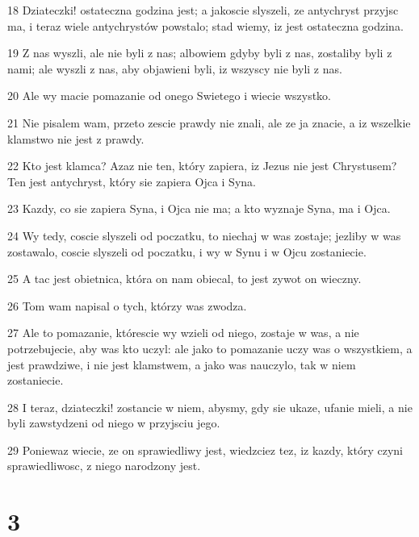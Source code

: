 \par 18 Dziateczki! ostateczna godzina jest; a jakoscie slyszeli, ze antychryst przyjsc ma, i teraz wiele antychrystów powstalo; stad wiemy, iz jest ostateczna godzina.
\par 19 Z nas wyszli, ale nie byli z nas; albowiem gdyby byli z nas, zostaliby byli z nami; ale wyszli z nas, aby objawieni byli, iz wszyscy nie byli z nas.
\par 20 Ale wy macie pomazanie od onego Swietego i wiecie wszystko.
\par 21 Nie pisalem wam, przeto zescie prawdy nie znali, ale ze ja znacie, a iz wszelkie klamstwo nie jest z prawdy.
\par 22 Kto jest klamca? Azaz nie ten, który zapiera, iz Jezus nie jest Chrystusem? Ten jest antychryst, który sie zapiera Ojca i Syna.
\par 23 Kazdy, co sie zapiera Syna, i Ojca nie ma; a kto wyznaje Syna, ma i Ojca.
\par 24 Wy tedy, coscie slyszeli od poczatku, to niechaj w was zostaje; jezliby w was zostawalo, coscie slyszeli od poczatku, i wy w Synu i w Ojcu zostaniecie.
\par 25 A tac jest obietnica, która on nam obiecal, to jest zywot on wieczny.
\par 26 Tom wam napisal o tych, którzy was zwodza.
\par 27 Ale to pomazanie, którescie wy wzieli od niego, zostaje w was, a nie potrzebujecie, aby was kto uczyl: ale jako to pomazanie uczy was o wszystkiem, a jest prawdziwe, i nie jest klamstwem, a jako was nauczylo, tak w niem zostaniecie.
\par 28 I teraz, dziateczki! zostancie w niem, abysmy, gdy sie ukaze, ufanie mieli, a nie byli zawstydzeni od niego w przyjsciu jego.
\par 29 Poniewaz wiecie, ze on sprawiedliwy jest, wiedzciez tez, iz kazdy, który czyni sprawiedliwosc, z niego narodzony jest.

\chapter{3}

